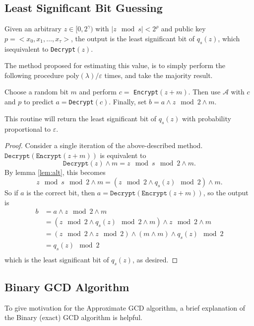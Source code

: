 \documentclass[a4paper,11pt, oneside]{article}
\begin{document}
\subsection{Least Significant Bit Guessing}
   Given an arbitrary $z\in[0,2^\gamma)$ with $|z\mod{s}| < 2^\rho$ and public key $p = <x_0,x_1,\dots,x_\tau>$, the output is the least significant bit of $q_s(z)$, which isequivalent to \texttt{Decrypt}$(z)$.

    The method proposed for estimating this value, is to simply perform the following procedure poly$(\lambda)/\varepsilon$ times, and take the majority result.

    Choose a random bit $m$ and perform $c = $ \texttt{Encrypt}$(z+m)$.  Then use $\mathcal{A}$ with $c$ and $p$ to predict $a = $\texttt{Decrypt}$(c)$.  Finally, set $b = a \wedge z\mod{2} \wedge m$.  
    
\begin{theorem}
    This routine will return the least significant bit of $q_s(z)$ with probability proportional to $\varepsilon$.
\end{theorem}

\begin{proof}
    Consider a single iteration of the above-described method.  $\texttt{Decrypt}(\texttt{Encrypt}(z+m))$ is equivalent to
    \[\texttt{Decrypt}(z)\wedge m = z\mod{s}\mod{2} \wedge m.\]
    By lemma \ref{lem:alt}, this becomes
    \[z\mod{s}\mod{2}\wedge m = \left(z\mod{2}\wedge q_s(z)\mod{2}\right) \wedge m.\]
    So if $a$ is the correct bit, then $a = \texttt{Decrypt}(\texttt{Encrypt}(z+m))$, so the output is
    \begin{align*}
        b &= a \wedge z\mod{2} \wedge m\\
        &=\left( z\mod{2}\wedge q_s(z)\mod{2}\wedge m\right)\wedge z\mod{2}\wedge m\\
        &=\left( z\mod{2}\wedge z\mod{2} \right)\wedge \left( m\wedge m \right) \wedge q_s(z)\mod{2}\\
        &= q_s(z)\mod{2}\\
    \end{align*}
    which is the least significant bit of $q_s(z)$, as desired.
\end{proof}

\subsection{Binary GCD Algorithm}
To give motivation for the Approximate GCD algorithm, a brief explanation of the Binary (exact) GCD algorithm is helpful.
\end{document}
